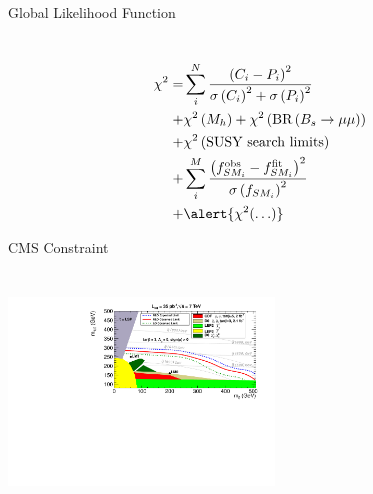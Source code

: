 \documentclass{beamer}
\begin{document}
\begin{frame}{Global Likelihood Function}
\section{\insertframetitle}
\begin{eqnarray}
  \chi^{2}=&\sum_{i}^{N}\frac{\left(C_{i}-P_{i}\right)^2}{\sigma\left(C_{i}\right)^2+\sigma\left(P_{i}\right)^2}\\
	  +&\chi^{2}\left(M_{h}\right)+\chi^{2}\left(\textrm{BR}\left(B_{s}\rightarrow\mu\mu\right)\right)\\
	  +&\chi^{2}\left(\textrm{SUSY search limits}\right)\\
	  +&\sum_{i}^{M}\frac{\left(f_{SM_{i}}^{\textrm{obs}}-f_{SM_{i}}^{\textrm{fit}}\right)^{2}}{\sigma\left(f_{SM_{i}}\right)^{2}}\\
    +&\alert{\chi^{2}(\hdots)}
\end{eqnarray}
\end{frame}

\begin{frame}{CMS Constraint}
\section{\insertframetitle}
  \includegraphics[height=5cm]{cms-excl.pdf}
\end{frame}
\end{document}

